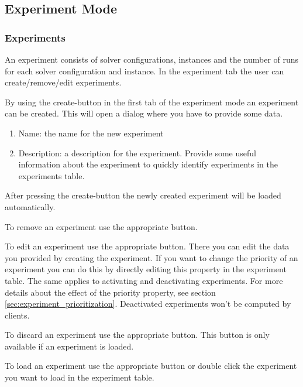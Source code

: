 \subsection{Experiment Mode}
\subsubsection{Experiments}
An experiment consists of solver configurations, instances and the number of runs for each solver configuration and instance. In the experiment tab the user can create/remove/edit experiments.

By using the create-button in the first tab of the experiment mode an experiment can be created. This will open a dialog where you have to provide some data.
\begin{enumerate}
\item Name: the name for the new experiment
\item Description: a description for the experiment. Provide some useful information about the experiment to quickly identify experiments in the experiments table.
\end{enumerate}
After pressing the create-button the newly created experiment will be loaded automatically.

To remove an experiment use the appropriate button.

To edit an experiment use the appropriate button. There you can edit the data you provided by creating the experiment. If you want to change the priority of an experiment you can do this by directly editing this property in the experiment table. The same applies to activating and deactivating experiments. For more details about the effect of the priority property, see section \ref{sec:experiment_prioritization}. Deactivated experiments won't be computed by clients.

To discard an experiment use the appropriate button. This button is only available if an experiment is loaded.

To load an experiment use the appropriate button or double click the experiment you want to load in the experiment table.

